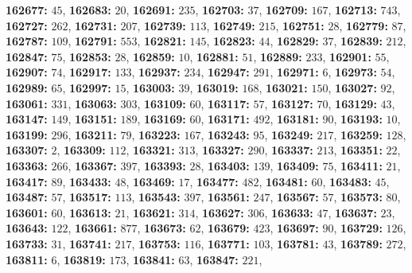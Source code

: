 \textsf{\bfseries 162677:} $45$, \textsf{\bfseries 162683:} $20$, \textsf{\bfseries 162691:} $235$, \textsf{\bfseries 162703:} $37$, \textsf{\bfseries 162709:} $167$, \textsf{\bfseries 162713:} $743$, \textsf{\bfseries 162727:} $262$, \textsf{\bfseries 162731:} $207$, \textsf{\bfseries 162739:} $113$, \textsf{\bfseries 162749:} $215$, \textsf{\bfseries 162751:} $28$, \textsf{\bfseries 162779:} $87$, \textsf{\bfseries 162787:} $109$, \textsf{\bfseries 162791:} $553$, \textsf{\bfseries 162821:} $145$, \textsf{\bfseries 162823:} $44$, \textsf{\bfseries 162829:} $37$, \textsf{\bfseries 162839:} $212$, \textsf{\bfseries 162847:} $75$, \textsf{\bfseries 162853:} $28$, \textsf{\bfseries 162859:} $10$, \textsf{\bfseries 162881:} $51$, \textsf{\bfseries 162889:} $233$, \textsf{\bfseries 162901:} $55$, \textsf{\bfseries 162907:} $74$, \textsf{\bfseries 162917:} $133$, \textsf{\bfseries 162937:} $234$, \textsf{\bfseries 162947:} $291$, \textsf{\bfseries 162971:} $6$, \textsf{\bfseries 162973:} $54$, \textsf{\bfseries 162989:} $65$, \textsf{\bfseries 162997:} $15$, \textsf{\bfseries 163003:} $39$, \textsf{\bfseries 163019:} $168$, \textsf{\bfseries 163021:} $150$, \textsf{\bfseries 163027:} $92$, \textsf{\bfseries 163061:} $331$, \textsf{\bfseries 163063:} $303$, \textsf{\bfseries 163109:} $60$, \textsf{\bfseries 163117:} $57$, \textsf{\bfseries 163127:} $70$, \textsf{\bfseries 163129:} $43$, \textsf{\bfseries 163147:} $149$, \textsf{\bfseries 163151:} $189$, \textsf{\bfseries 163169:} $60$, \textsf{\bfseries 163171:} $492$, \textsf{\bfseries 163181:} $90$, \textsf{\bfseries 163193:} $10$, \textsf{\bfseries 163199:} $296$, \textsf{\bfseries 163211:} $79$, \textsf{\bfseries 163223:} $167$, \textsf{\bfseries 163243:} $95$, \textsf{\bfseries 163249:} $217$, \textsf{\bfseries 163259:} $128$, \textsf{\bfseries 163307:} $2$, \textsf{\bfseries 163309:} $112$, \textsf{\bfseries 163321:} $313$, \textsf{\bfseries 163327:} $290$, \textsf{\bfseries 163337:} $213$, \textsf{\bfseries 163351:} $22$, \textsf{\bfseries 163363:} $266$, \textsf{\bfseries 163367:} $397$, \textsf{\bfseries 163393:} $28$, \textsf{\bfseries 163403:} $139$, \textsf{\bfseries 163409:} $75$, \textsf{\bfseries 163411:} $21$, \textsf{\bfseries 163417:} $89$, \textsf{\bfseries 163433:} $48$, \textsf{\bfseries 163469:} $17$, \textsf{\bfseries 163477:} $482$, \textsf{\bfseries 163481:} $60$, \textsf{\bfseries 163483:} $45$, \textsf{\bfseries 163487:} $57$, \textsf{\bfseries 163517:} $113$, \textsf{\bfseries 163543:} $397$, \textsf{\bfseries 163561:} $247$, \textsf{\bfseries 163567:} $57$, \textsf{\bfseries 163573:} $80$, \textsf{\bfseries 163601:} $60$, \textsf{\bfseries 163613:} $21$, \textsf{\bfseries 163621:} $314$, \textsf{\bfseries 163627:} $306$, \textsf{\bfseries 163633:} $47$, \textsf{\bfseries 163637:} $23$, \textsf{\bfseries 163643:} $122$, \textsf{\bfseries 163661:} $877$, \textsf{\bfseries 163673:} $62$, \textsf{\bfseries 163679:} $423$, \textsf{\bfseries 163697:} $90$, \textsf{\bfseries 163729:} $126$, \textsf{\bfseries 163733:} $31$, \textsf{\bfseries 163741:} $217$, \textsf{\bfseries 163753:} $116$, \textsf{\bfseries 163771:} $103$, \textsf{\bfseries 163781:} $43$, \textsf{\bfseries 163789:} $272$, \textsf{\bfseries 163811:} $6$, \textsf{\bfseries 163819:} $173$, \textsf{\bfseries 163841:} $63$, \textsf{\bfseries 163847:} $221$, 
